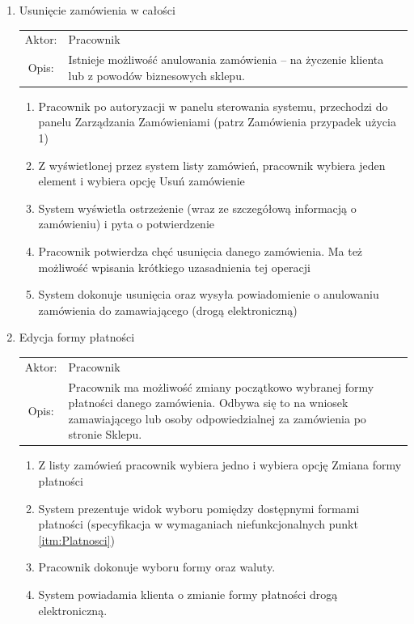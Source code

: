 \begin{enumerate}
  \item Usunięcie zamówienia w całości\\
  \begin{tabularx}{\linewidth}{c X}
  Aktor: & Pracownik \\
  Opis: & Istnieje możliwość anulowania zamówienia – na życzenie klienta lub z
  powodów biznesowych sklepu.
  \end{tabularx}  
	\begin{enumerate}
	  \item Pracownik po autoryzacji w panelu sterowania systemu, przechodzi do
	  panelu Zarządzania Zamówieniami (patrz Zamówienia przypadek użycia 1)
	  \item Z wyświetlonej przez system listy zamówień, pracownik wybiera jeden
	  element i wybiera opcję Usuń zamówienie
	  \item System wyświetla ostrzeżenie (wraz ze szczegółową informacją o
	  zamówieniu) i pyta o potwierdzenie
	  \item Pracownik potwierdza chęć usunięcia danego zamówienia. Ma też możliwość
	  wpisania krótkiego uzasadnienia tej operacji
	  \item System dokonuje usunięcia oraz wysyła powiadomienie o anulowaniu
	  zamówienia do zamawiającego (drogą elektroniczną)
	\end{enumerate}

  \item Edycja formy płatności\\
  \begin{tabularx}{\linewidth}{c X}
  Aktor: & Pracownik \\
  Opis: & Pracownik ma możliwość zmiany początkowo wybranej formy płatności
  danego zamówienia. Odbywa się to na wniosek zamawiającego lub osoby
  odpowiedzialnej za zamówienia po stronie Sklepu.
  \end{tabularx}    
	\begin{enumerate}
	  \item Z listy zamówień pracownik wybiera jedno i wybiera opcję Zmiana formy
	  płatności
	  \item System prezentuje widok wyboru pomiędzy dostępnymi formami płatności
	  (specyfikacja w wymaganiach niefunkcjonalnych punkt \ref{itm:Platnosci})
	  \item Pracownik dokonuje wyboru formy oraz waluty.
	  \item System powiadamia klienta o zmianie formy płatności drogą elektroniczną.
	\end{enumerate}


\end{enumerate}
